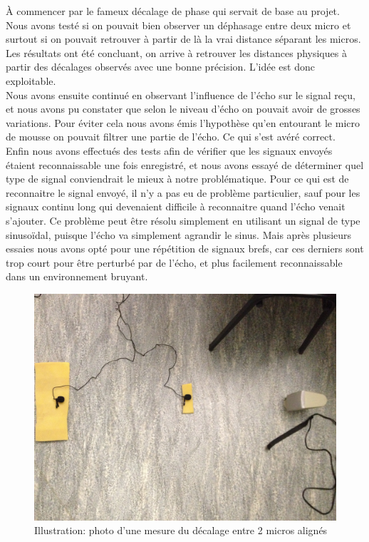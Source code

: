 \documentclass[12pt,a4paper]{report}
\begin{document}
À commencer par le fameux décalage de phase qui servait de base au projet. Nous avons testé si on pouvait bien observer un déphasage entre deux micro et surtout si on pouvait retrouver à partir de là la vrai distance séparant les micros. Les résultats ont été concluant, on arrive à retrouver les distances physiques à partir des décalages observés avec une bonne précision. L'idée est donc exploitable.\\

Nous avons ensuite continué en observant l'influence de l'écho sur le signal reçu, et nous avons pu constater que selon le niveau d'écho on pouvait avoir de grosses variations. Pour éviter cela nous avons émis l'hypothèse qu'en entourant le micro de mousse on pouvait filtrer une partie de l'écho. Ce qui s'est avéré correct.\\

Enfin nous avons effectués des tests afin de vérifier que les signaux envoyés étaient reconnaissable une fois enregistré, et nous avons essayé de déterminer quel type de signal conviendrait le mieux à notre problématique. Pour ce qui est de reconnaitre le signal envoyé, il n'y a pas eu de problème particulier, sauf pour les signaux continu long qui devenaient difficile à reconnaitre quand l'écho venait s'ajouter. Ce problème peut être résolu simplement en utilisant un signal de type sinusoïdal, puisque l'écho va simplement agrandir le sinus. Mais après plusieurs essaies nous avons opté pour une répétition de signaux brefs, car ces derniers sont trop court pour être perturbé par de l'écho, et plus facilement reconnaissable dans un environnement bruyant.\\

\begin{figure}
\includegraphics[width=15cm]{../tests/lecture_de_signaux_carres/donnees11-03/test_2.jpg}
\caption{Illustration: photo d'une mesure du décalage entre 2 micros alignés}
\end{figure}
\end{document}
